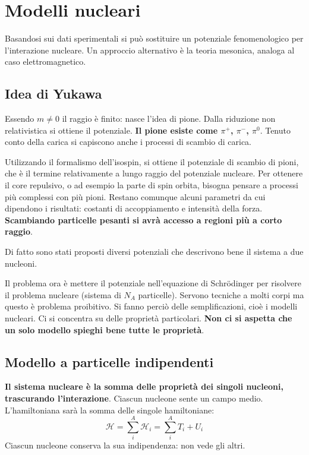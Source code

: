 \documentclass[a4paper,11pt,twoside,openany]{book}
\theoremstyle{definition}
\theoremstyle{plain}
\theoremstyle{plain}
\theoremstyle{definition}
\begin{document}
\chapter{Modelli nucleari} %
Basandosi sui dati sperimentali si può sostituire un potenziale fenomenologico per l'interazione nucleare. Un approccio alternativo è la teoria mesonica, analoga al caso elettromagnetico.

\section{Idea di Yukawa} %
Essendo $m\neq 0$ il raggio è finito: nasce l'idea di pione. Dalla riduzione non relativistica si ottiene il potenziale. \textbf{Il pione esiste come $\pi^+$, $\pi^-$, $\pi^0$}. Tenuto conto della carica si capiscono anche i processi di scambio di carica.

Utilizzando il formalismo dell'isospin, si ottiene il potenziale di scambio di pioni, che è il termine relativamente a lungo raggio del potenziale nucleare. Per ottenere il core repulsivo, o ad esempio la parte di spin orbita, bisogna pensare a processi più complessi con più pioni. Restano comunque alcuni parametri da cui dipendono i risultati: costanti di accoppiamento e intensità della forza. 
\textbf{Scambiando particelle pesanti si avrà accesso a regioni più a corto raggio}.

Di fatto sono stati proposti diversi potenziali che descrivono bene il sistema a due nucleoni.

Il problema ora è mettere il potenziale nell'equazione di Schrödinger per risolvere il problema nucleare (sistema di $N_A$ particelle). Servono tecniche a molti corpi ma questo è problema proibitivo. Si fanno perciò delle semplificazioni, cioè i modelli nucleari. Ci si concentra su delle proprietà particolari. \textbf{Non ci si aspetta che un solo modello spieghi bene tutte le proprietà}.

\section{Modello a particelle indipendenti} %
\textbf{Il sistema nucleare è la somma delle proprietà dei singoli nucleoni, trascurando l'interazione}. Ciascun nucleone sente un campo medio. L'hamiltoniana sarà la somma delle singole hamiltoniane:
\begin{equation}
\mathcal{H}=\sum^A_i\mathcal{H}_i=\sum^A_i{T_i+U_i}
\end{equation}
Ciascun nucleone conserva la sua indipendenza: non vede gli altri.
\end{document}
